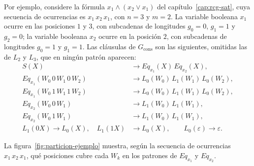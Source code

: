 Por ejemplo, considere la fórmula $x_1 \wedge (x_2 \vee x_1)$ del
capítulo~\ref{cap:rcg-sat}, cuya secuencia de ocurrencias es
$x_1\,x_2\,x_1$, con $n=3$ y $m=2$. La variable booleana $x_1$ ocurre en las
posiciones $1$ y $3$, con subcadenas de longitudes $g_0=0$, $g_1=1$ y
$g_2=0$; la variable booleana $x_2$ ocurre en la posición $2$, con subcadenas
de longitudes $g_0=1$ y $g_1=1$. Las cláusulas de $G_{\mathrm{cons}}$
son las siguientes, omitidas las de $L_2$ y $L_3$, que en ningún
patrón aparecen:
\[
\begin{aligned}
  S(X) &\to Eq_{x_1}(X)\, Eq_{x_2}(X),\\
  Eq_{x_1}(W_0\,0\,W_1\,0\,W_2) &\to L_0(W_0)\, L_1(W_1)\, L_0(W_2),\\
  Eq_{x_1}(W_0\,1\,W_1\,1\,W_2) &\to L_0(W_0)\, L_1(W_1)\, L_0(W_2),\\
  Eq_{x_2}(W_0\,0\,W_1) &\to L_1(W_0)\, L_1(W_1),\\
  Eq_{x_2}(W_0\,1\,W_1) &\to L_1(W_0)\, L_1(W_1),\\
  L_1(0X) \to L_0(X), \quad L_1(1X) &\to L_0(X), \qquad
  L_0(\varepsilon) \to \varepsilon.
\end{aligned}
\]

La figura~\ref{fig:particion-ejemplo} muestra, según la secuencia de
ocurrencias $x_1\,x_2\,x_1$, qué posiciones cubre cada $W_k$ en los
patrones de $Eq_{x_1}$ y $Eq_{x_2}$.

